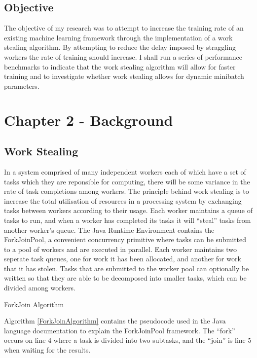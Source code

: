 \documentclass[12pt]{article}
\begin{document}
\subsection{Objective}
The objective of my research was to attempt to increase the training rate of an existing machine learning framework through the implementation of a work stealing algorithm. By attempting to reduce the delay imposed by straggling workers the rate of training should increase.
\newline
\newline
I shall run a series of performance benchmarks to indicate that the work stealing algorithm will allow for faster training and to investigate whether work stealing allows for dynamic minibatch parameters.

\newpage

\section{Chapter 2 - Background}

\subsection{Work Stealing}

In a system comprised of many independent workers each of which have a set of tasks which they are reponsible for computing, there will be some variance in the rate of task completions among workers.
\newline
\newline
The principle behind work stealing is to increase the total utilisation of resources in a processing system by exchanging tasks between workers according to their usage. Each worker maintains a queue of tasks to run, and when a worker has completed its tasks it will ``steal'' tasks from another worker's queue.
\newline
\newline
The Java Runtime Environment contains the ForkJoinPool\cite{javaThreads}, a convenient concurrency primitive where tasks can be submitted to a pool of workers and are executed in parallel. Each worker maintains two seperate task queues, one for work it has been allocated, and another for work that it has stolen. Tasks that are submitted to the worker pool can optionally be written so that they are able to be decomposed into smaller tasks, which can be divided among workers.
\newline

\IncMargin{1em}
\begin{algorithm}[H]
 \caption{ForkJoin Algorithm}
 \label{ForkJoinAlgorithm}
\end{algorithm}
\DecMargin{1em}
\medskip
Algorithm \ref{ForkJoinAlgorithm} contains the pseudocode used in the Java language documentation to explain the ForkJoinPool framework. The ``fork'' occurs on line 4 where a task is divided into two subtasks, and the ``join'' is line 5 when waiting for the results.
\end{document}
